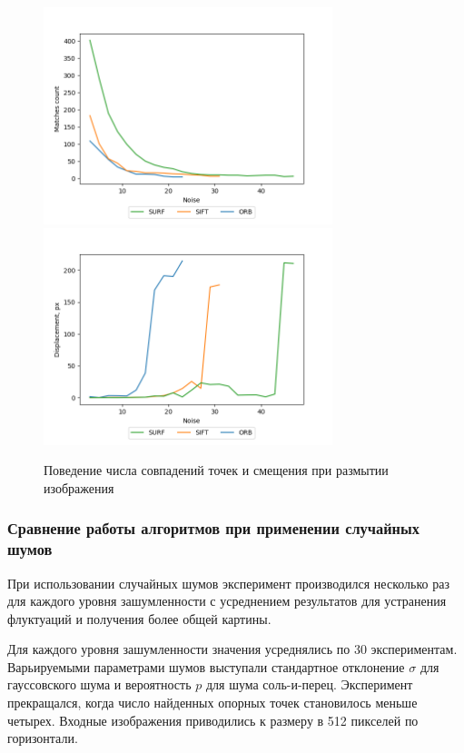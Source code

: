 {{   			\begin{figure}[H]
   				\centering                             
   				\includegraphics[width=0.75\textwidth,keepaspectratio]{ex1/Rand_noises_matches.png}   
   				\includegraphics[width=0.75\textwidth,keepaspectratio]{ex1/Rand_noises_displacement.png}       
   				\centering\caption{ Поведение числа совпадений точек и смещения при размытии изображения }
   				\label{blur_mch_disp}                           
   			\end{figure}    
   			
   			\newpage
   			\subsubsection{ Сравнение работы алгоритмов при применении случайных шумов } При использовании случайных шумов эксперимент производился несколько раз для каждого уровня зашумленности с усреднением результатов для устранения флуктуаций и получения более общей картины. 
   			
   			Для каждого уровня зашумленности значения усреднялись по 30 экспериментам. Варьируемыми параметрами шумов выступали стандартное отклонение $\sigma$ для гауссовского шума и вероятность $p$ для шума соль-и-перец. Эксперимент прекращался, когда число найденных опорных точек становилось меньше четырех. Входные изображения приводились к размеру в 512 пикселей по горизонтали.
   			
}}
